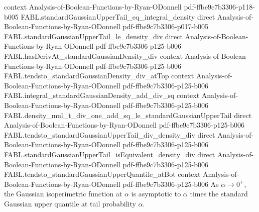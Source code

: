 \begin{theorem}
  {context}
  {Analysis-of-Boolean-Functions-by-Ryan-ODonnell}
  {pdf-ffbe9c7b3306-p118-b005}
\proofstep
  {FABL.standardGaussianUpperTail_eq_integral_density}
  {direct}
  {Analysis-of-Boolean-Functions-by-Ryan-ODonnell}
  {pdf-ffbe9c7b3306-p017-b005}
\proofstep
  {FABL.standardGaussianUpperTail_le_density_div}
  {direct}
  {Analysis-of-Boolean-Functions-by-Ryan-ODonnell}
  {pdf-ffbe9c7b3306-p125-b006}
\proofstep
  {FABL.hasDerivAt_standardGaussianDensity_div}
  {context}
  {Analysis-of-Boolean-Functions-by-Ryan-ODonnell}
  {pdf-ffbe9c7b3306-p125-b006}
\proofstep
  {FABL.tendsto_standardGaussianDensity_div_atTop}
  {context}
  {Analysis-of-Boolean-Functions-by-Ryan-ODonnell}
  {pdf-ffbe9c7b3306-p125-b006}
\proofstep
  {FABL.integral_standardGaussianDensity_add_div_sq}
  {context}
  {Analysis-of-Boolean-Functions-by-Ryan-ODonnell}
  {pdf-ffbe9c7b3306-p125-b006}
\proofstep
  {FABL.density_mul_t_div_one_add_sq_le_standardGaussianUpperTail}
  {direct}
  {Analysis-of-Boolean-Functions-by-Ryan-ODonnell}
  {pdf-ffbe9c7b3306-p125-b006}
\proofstep
  {FABL.tendsto_standardGaussianUpperTail_div_density_div}
  {direct}
  {Analysis-of-Boolean-Functions-by-Ryan-ODonnell}
  {pdf-ffbe9c7b3306-p125-b006}
\proofstep
  {FABL.standardGaussianUpperTail_isEquivalent_density_div}
  {direct}
  {Analysis-of-Boolean-Functions-by-Ryan-ODonnell}
  {pdf-ffbe9c7b3306-p125-b006}
\proofstep
  {FABL.tendsto_standardGaussianUpperQuantile_atBot}
  {context}
  {Analysis-of-Boolean-Functions-by-Ryan-ODonnell}
  {pdf-ffbe9c7b3306-p125-b006}
As $\alpha\to0^+$, the Gaussian isoperimetric function at $\alpha$ is asymptotic to
$\alpha$ times the standard Gaussian upper quantile at tail probability $\alpha$.
\end{theorem}


